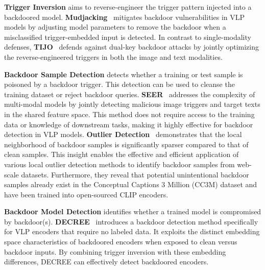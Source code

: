 \textbf{Trigger Inversion} aims to reverse-engineer the trigger pattern injected into a backdoored model. \textbf{Mudjacking}~\cite{liu2024mudjacking} mitigates backdoor vulnerabilities in VLP models by adjusting model parameters to remove the backdoor when a misclassified trigger-embedded input is detected. In contrast to single-modality defenses, \textbf{TIJO}~\cite{sur2023tijo} defends against dual-key backdoor attacks by jointly optimizing the reverse-engineered triggers in both the image and text modalities.

\textbf{Backdoor Sample Detection} detects whether a training or test sample is poisoned by a backdoor trigger. This detection can be used to cleanse the training dataset or reject backdoor queries. \textbf{SEER}~\cite{zhu2024seer} addresses the complexity of multi-modal models by jointly detecting malicious image triggers and target texts in the shared feature space. This method does not require access to the training data or knowledge of downstream tasks, making it highly effective for backdoor detection in VLP models. \textbf{Outlier Detection}~\cite{huang2025detecting} demonstrates that the local neighborhood of backdoor samples is significantly sparser compared to that of clean samples. This insight enables the effective and efficient application of various local outlier detection methods to identify backdoor samples from web-scale datasets. Furthermore, they reveal that potential unintentional backdoor samples already exist in the Conceptual Captions 3 Million (CC3M) dataset and have been trained into open-sourced CLIP encoders.

\textbf{Backdoor Model Detection} identifies whether a trained model is compromised by backdoor(s). \textbf{DECREE}~\cite{feng2023detecting} introduces a backdoor detection method specifically for VLP encoders that require no labeled data. It exploits the distinct embedding space characteristics of backdoored encoders when exposed to clean versus backdoor inputs. By combining trigger inversion with these embedding differences, DECREE can effectively detect backdoored encoders.



